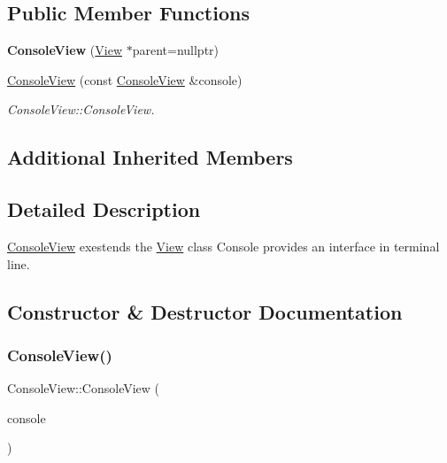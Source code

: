 \subsection*{Public Member Functions}
\begin{DoxyCompactItemize}
\item 
\mbox{\label{class_console_view_ae8a2079a84bc7b7e2b8a68f927cae911}} 
{\bfseries Console\+View} (\hyperlink{class_view}{View} $\ast$parent=nullptr)
\item 
\hyperlink{class_console_view_a42ca0ca912c42d743a64f7e3a80b6f26}{Console\+View} (const \hyperlink{class_console_view}{Console\+View} \&console)
\begin{DoxyCompactList}\small\item\em Console\+View\+::\+Console\+View. \end{DoxyCompactList}\end{DoxyCompactItemize}
\subsection*{Additional Inherited Members}


\subsection{Detailed Description}
\hyperlink{class_console_view}{Console\+View} exestends the \hyperlink{class_view}{View} class Console provides an interface in terminal line. 

\subsection{Constructor \& Destructor Documentation}
\mbox{\label{class_console_view_a42ca0ca912c42d743a64f7e3a80b6f26}} 
\subsubsection{\texorpdfstring{Console\+View()}{ConsoleView()}}
{\footnotesize\ttfamily Console\+View\+::\+Console\+View (\begin{DoxyParamCaption}\item[{const \hyperlink{class_console_view}{Console\+View} \&}]{console }\end{DoxyParamCaption})}



